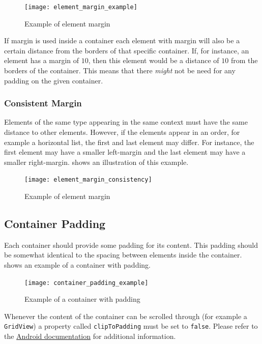 \begin{figure}[h]
        \centering
        \texttt{[image: element\_margin\_example]}
        \caption{Example of element margin}
        \label{fig:element_margin_example}
\end{figure}

\begin{note}
        If margin is used inside a container each element with margin will also be a certain distance from the borders of that specific container. If, for instance, an element has a margin of $10$, then this element would be a distance of $10$ from the borders of the container. This means that there \textit{might} not be need for any padding on the given container.
\end{note}

\subsubsection{Consistent Margin}
Elements of the same type appearing in the same context must have the same distance to other elements. However, if the elements appear in an order, for example a horizontal list, the first and last element may differ. For instance, the first element may have a smaller left-margin and the last element may have a smaller right-margin.  shows an illustration of this example.

\begin{figure}[h]
        \centering
        \texttt{[image: element\_margin\_consistency]}
        \caption{Example of element margin}
        \label{fig:element_margin_consistency}
\end{figure}


\subsection{Container Padding}
Each container should provide some padding for its content. This padding should be somewhat identical to the spacing between elements inside the container.  shows an example of a container with padding. 

\begin{figure}[h]
        \centering
        \texttt{[image: container\_padding\_example]}
        \caption{Example of a container with padding}
        \label{fig:container_padding_example}
\end{figure}

\begin{note}
        Whenever the content of the container can be scrolled through (for example a \texttt{GridView}) a property called \texttt{clipToPadding} must be set to \texttt{false}. Please refer to the \href{http://developer.android.com/reference/android/view/ViewGroup.html#attr_android:clipToPadding}{Android documentation} for additional information.
\end{note}

